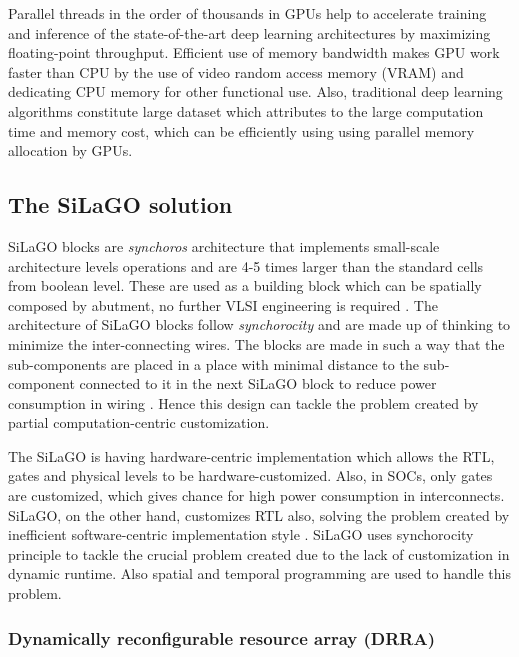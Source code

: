 \documentclass[journal]{IEEEtran}
\begin{document}
\par Parallel threads in the order of thousands in GPUs help to accelerate training and inference of the state-of-the-art deep learning architectures by maximizing floating-point throughput. Efficient use of memory bandwidth makes GPU work faster than CPU by the use of video random access memory (VRAM) and dedicating CPU memory for other functional use. Also, traditional deep learning algorithms constitute large dataset which attributes to the large computation time and memory cost, which can be efficiently using using parallel memory allocation by GPUs. 

\subsection{The SiLaGO solution}
SiLaGO blocks are \textit{synchoros} architecture that implements small-scale architecture levels operations and are 4-5 times larger than the standard cells from boolean level. These are used as a building block which can be spatially composed by abutment, no further VLSI engineering is required \cite{paper4}. The architecture of SiLaGO blocks follow \textit{synchorocity} and are made up of thinking to minimize the inter-connecting wires. The blocks are made in such a way that the sub-components are placed in a place with minimal distance to the sub-component connected to it in the next SiLaGO block to reduce power consumption in wiring \cite{paper5}. Hence this design can tackle the problem created by partial computation-centric customization. 

\par The SiLaGO is having hardware-centric implementation which allows the RTL, gates and physical levels to be hardware-customized. Also, in SOCs, only gates are customized, which gives chance for high power consumption in interconnects. SiLaGO, on the other hand, customizes RTL also, solving the problem created by inefficient software-centric implementation style \cite{paper5}. SiLaGO uses synchorocity principle to tackle the crucial problem created due to the lack of customization in dynamic runtime. Also spatial and temporal programming \cite{paper5} are used to handle this problem.

\subsubsection{Dynamically reconfigurable resource array (DRRA)}
\end{document}
